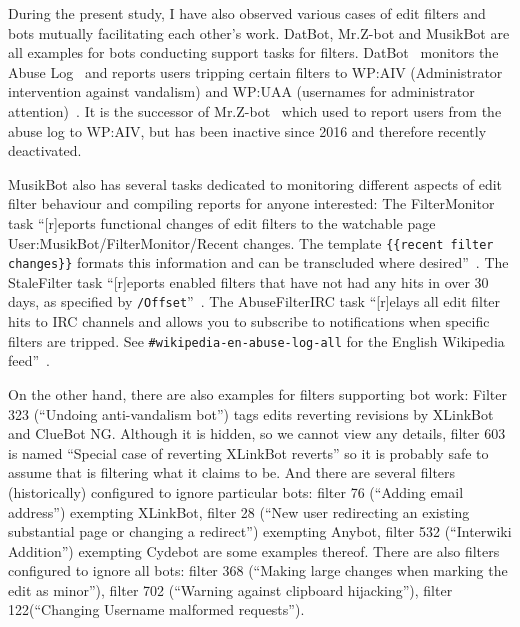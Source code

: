 During the present study, I have also observed various cases of edit filters and bots mutually facilitating each other's work.
DatBot, Mr.Z-bot and MusikBot are all examples for bots conducting support tasks for filters.
DatBot~\cite{Wikipedia:DatBot} monitors the Abuse Log~\cite{Wikipedia:AbuseLog}
and reports users tripping certain filters to WP:AIV (Administrator intervention against vandalism)\cite{Wikipedia:AIV} and WP:UAA (usernames for administrator attention)~\cite{Wikipedia:UAA}.
It is the successor of Mr.Z-bot~\cite{Wikipedia:MrZBot}
which used to report users from the abuse log to WP:AIV, but has been inactive since 2016 and therefore recently deactivated.

MusikBot also has several tasks dedicated to monitoring different aspects of edit filter behaviour and compiling reports for anyone interested:
The FilterMonitor task ``[r]eports functional changes of edit filters to the watchable page User:MusikBot/FilterMonitor/Recent changes. The template \verb|{{recent filter changes}}| formats this information and can be transcluded where desired''~\cite{Wikipedia:MusikBotFilterMonitor}.
The StaleFilter task ``[r]eports enabled filters that have not had any hits in over 30 days, as specified by \verb|/Offset|''~\cite{Wikipedia:MusikBotStaleFilters}.
The AbuseFilterIRC task ``[r]elays all edit filter hits to IRC channels and allows you to subscribe to notifications when specific filters are tripped. See \verb|#wikipedia-en-abuse-log-all| for the English Wikipedia feed''~\cite{Wikipedia:MusikBotAbuseFilterIRC}.

On the other hand, there are also examples for filters supporting bot work:
Filter 323 (``Undoing anti-vandalism bot'') tags edits reverting revisions by XLinkBot and ClueBot NG.
Although it is hidden, so we cannot view any details, filter 603 is named ``Special case of reverting XLinkBot reverts'' so it is probably safe to assume that is filtering what it claims to be.
And there are several filters (historically) configured to ignore particular bots: filter 76 (``Adding email address'') exempting XLinkBot, filter 28 (``New user redirecting an existing substantial page or changing a redirect'') exempting Anybot, filter 532 (``Interwiki Addition'') exempting Cydebot are some examples thereof.
There are also filters configured to ignore all bots: filter 368 (``Making large changes when marking the edit as minor''), filter 702 (``Warning against clipboard hijacking''), filter 122(``Changing Username malformed requests'').


